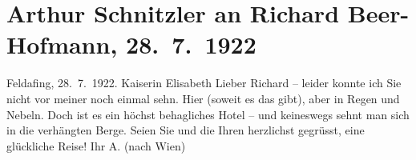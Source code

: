 

         
         \renewcommand{\erwaehntePersonen}{Personen: Richard Beer-Hofmann}
         \renewcommand{\erwaehnteOrte}{Orte: Feldafing, Hotel Kaiserin Elisabeth, Wien}
         \renewcommand{\erwaehnteWerke}{}
               \section[Arthur Schnitzler an Richard Beer-Hofmann, 28. 7. 1922]{ Arthur Schnitzler an Richard Beer-Hofmann, 28. 7. 1922}\nopagebreak{}\rehead{ }\begin{ledgroupsized}[t]{13cm}\normalsize\beginnumbering \toendnotes[C]{\smallbreak\pagebreak[2]} 
\toendnotes[C]{\smallbreak}\pstart
           \raggedleft{}{\pb}Feldafing, 28. 7. 1922.\pend
           \pstart
           \raggedleft{}Kaiserin Elisabeth\pend
           \pstart
           Lieber Richard – leider konnte ich Sie nicht vor meiner \label{K_L02554-2v}\label{K_L02554-2h} noch einmal sehn. Hier \label{K_L02554-1v}\label{K_L02554-1h} (soweit es das gibt), aber in Regen und Nebeln. Doch ist es ein höchst
               behagliches Hotel – und
               keineswegs sehnt man sich in die verhängten Berge. Seien Sie und die Ihren herzlichst
               gegrüsst, eine glückliche Reise! Ihr \spacefill\mbox{A.}\pend
           \pstart
           \noindent{}(nach Wien)\pend
           
         
         \endnumbering{}\end{ledgroupsized}  \newcommand{\dateiname}{L02554}\newcommand{\titel}{Arthur Schnitzler an Richard Beer-Hofmann, 28. 7. 1922}\newcommand{\editorInnen}{Martin Anton Müller und Gerd-Hermann Susen}
      